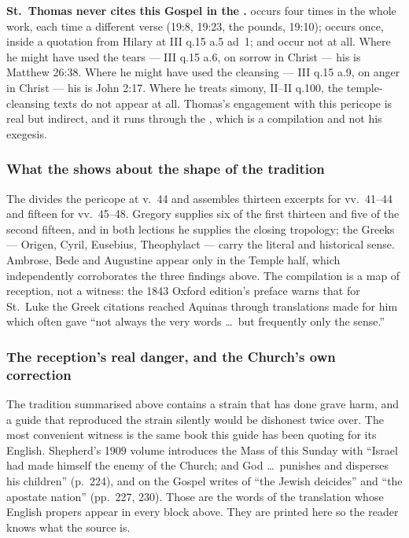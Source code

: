 \textbf{St.\ Thomas never cites this Gospel in the .}
 occurs four times in the whole work, each time a different
verse (19:8, 19:23, the pounds, 19:10);  occurs once, inside a
quotation from Hilary at III q.15 a.5 ad~1;  and
 occur not at all. Where he might have used the tears
--- III q.15 a.6, on sorrow in Christ --- his  is Matthew
26:38. Where he might have used the cleansing --- III q.15 a.9, on anger in
Christ --- his  is John 2:17. Where he treats simony,
II--II q.100, the temple-cleansing texts do not appear at all. Thomas's
engagement with this pericope is real but indirect, and it runs through the
, which is a compilation and not his exegesis.

\subsubsection*{What the  shows about the shape of the tradition}

The  divides the pericope at v.~44 and assembles thirteen
excerpts for vv.~41--44 and fifteen for vv.~45--48. Gregory supplies six of
the first thirteen and five of the second fifteen, and in both lections he
supplies the closing tropology; the Greeks --- Origen, Cyril, Eusebius,
Theophylact --- carry the literal and historical sense. Ambrose, Bede and
Augustine appear only in the Temple half, which independently corroborates
the three findings above. The compilation is a map of reception, not a
witness: the 1843 Oxford edition's preface warns that for St.~Luke the Greek
citations reached Aquinas through translations made for him which often gave
``not always the very words \dots\ but frequently only the sense.''

\subsubsection*{The reception's real danger, and the Church's own correction}

The tradition summarised above contains a strain that has done grave harm,
and a guide that reproduced the strain silently would be dishonest twice
over. The most convenient witness is the same book this guide has been
quoting for its English. Shepherd's 1909 volume introduces the Mass of this
Sunday with ``Israel had made himself the enemy of the Church; and God \dots\
punishes and disperses his children'' (p.~224), and on the Gospel writes of
``the Jewish deicides'' and ``the apostate nation'' (pp.~227, 230). Those are
the words of the translation whose English propers appear in every block
above. They are printed here so the reader knows what the source is.

